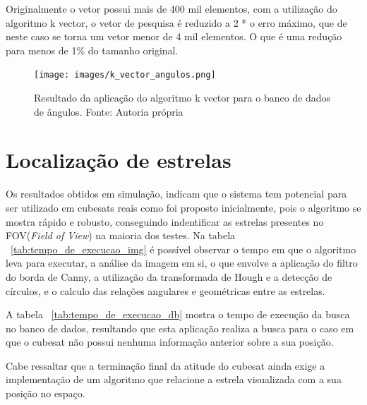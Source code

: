 Originalmente o vetor possui mais de 400 mil elementos, com a utilização do algoritmo k vector, 
o vetor de pesquisa é reduzido a 2 * o erro máximo, que de neste caso se torna um vetor menor de 4 mil elementos.
O que é uma redução para menos de 1\% do tamanho original.

\begin{figure}[H]
    \centering
    \texttt{[image: images/k\_vector\_angulos.png]}
    \caption{Resultado da aplicação do algoritmo k vector para o banco de dados de ângulos. Fonte: Autoria própria}
    \label{fig:k_vector_angulos}
\end{figure}

\section{Localização de estrelas}

Os resultados obtidos em simulação, 
indicam que o sistema tem potencial para ser utilizado em cubesats reais como foi proposto inicialmente,
pois o algoritmo se mostra rápido e robusto, conseguindo indentificar as estrelas presentes no FOV(\textit{Field of View}) na maioria dos testes. 
Na tabela ~\ref{tab:tempo_de_execucao_img} é possível observar o tempo em que o algoritmo leva para executar, 
a análise da imagem em si, o que envolve a aplicação do filtro do borda de Canny, a utilização da transformada de Hough e a detecção de círculos,
e o calculo das relações angulares e geométricas entre as estrelas.

A tabela ~\ref{tab:tempo_de_execucao_db} mostra o tempo de execução da busca no banco de dados,
resultando que esta aplicação realiza a busca para o caso em que o cubesat não possui nenhuma informação anterior sobre a sua posição.

Cabe ressaltar que a terminação final da atitude do cubesat ainda exige a implementação de um algoritmo que relacione a estrela visualizada com a sua posição no espaço.

